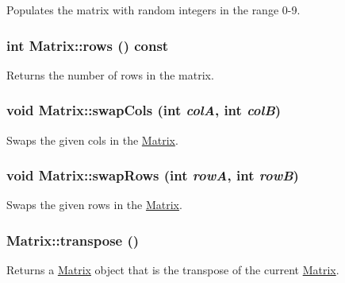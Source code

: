Populates the matrix with random integers in the range 0-\/9. 

\hypertarget{class_matrix_af238216c5c5ebf0a80e37bba96c99662}{
\subsubsection[{rows}]{\setlength{\rightskip}{0pt plus 5cm}int Matrix::rows () const}}
\label{class_matrix_af238216c5c5ebf0a80e37bba96c99662}


Returns the number of rows in the matrix. 

\hypertarget{class_matrix_a505f924baa7c236280751499da56ecee}{
\subsubsection[{swapCols}]{\setlength{\rightskip}{0pt plus 5cm}void Matrix::swapCols (int {\em colA}, \/  int {\em colB})}}
\label{class_matrix_a505f924baa7c236280751499da56ecee}


Swaps the given cols in the \hyperlink{class_matrix}{Matrix}. 

\hypertarget{class_matrix_ac0e73d5e98817e12b82a3f626c8343de}{
\subsubsection[{swapRows}]{\setlength{\rightskip}{0pt plus 5cm}void Matrix::swapRows (int {\em rowA}, \/  int {\em rowB})}}
\label{class_matrix_ac0e73d5e98817e12b82a3f626c8343de}


Swaps the given rows in the \hyperlink{class_matrix}{Matrix}. 

\hypertarget{class_matrix_ae23f817021383e3c8636a714dcba1d21}{
\subsubsection[{transpose}]{ Matrix::transpose ()}}
\label{class_matrix_ae23f817021383e3c8636a714dcba1d21}


Returns a \hyperlink{class_matrix}{Matrix} object that is the transpose of the current \hyperlink{class_matrix}{Matrix}. 



